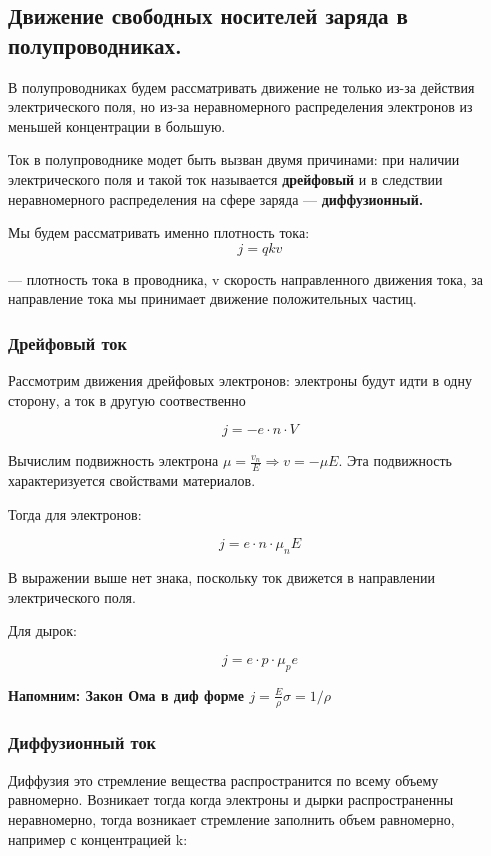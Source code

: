 \documentclass[../main.tex]{subfiles}
\begin{document}
\subsection{Движение свободных носителей заряда в полупроводниках.}

В полупроводниках будем рассматривать движение не только из-за действия электрического поля, но из-за неравномерного распределения электронов из меньшей концентрации в большую.

 Ток в полупроводнике модет быть вызван двумя причинами: при наличии электрического поля и такой ток называется \textbf{дрейфовый} и в следствии
 неравномерного распределения на сфере заряда --- \textbf{диффузионный.}

Мы будем рассматривать именно плотность тока:
\[j = q k v\]
\begin{center}
    --- плотность тока в проводника, v скорость направленного движения тока, за направление тока мы принимает движение положительных частиц.    
\end{center}

\subsubsection{Дрейфовый ток}

Рассмотрим движения дрейфовых электронов: электроны будут идти в одну сторону, а ток в другую соотвественно

\[j = -e \cdot n \cdot V\]

Вычислим подвижность электрона $\mu = \frac{v_n}{E} \Rightarrow v = - \mu E$. Эта подвижность характеризуется свойствами материалов. 

Тогда для электронов:

\[j = e \cdot n \cdot \mu_n E\] 

В выражении выше нет знака, поскольку ток движется в направлении электрического поля.

Для дырок:

\[j = e \cdot p \cdot \mu_p e\]

\textbf{Напомним: Закон Ома в диф форме $j = \frac{E}{\rho} \sigma = 1/\rho$}

\subsubsection{Диффузионный ток}

Диффузия это стремление вещества распространится по всему объему равномерно. Возникает тогда когда электроны и дырки распространенны неравномерно,
тогда возникает стремление заполнить объем равномерно, например с концентрацией k:
\end{document}
